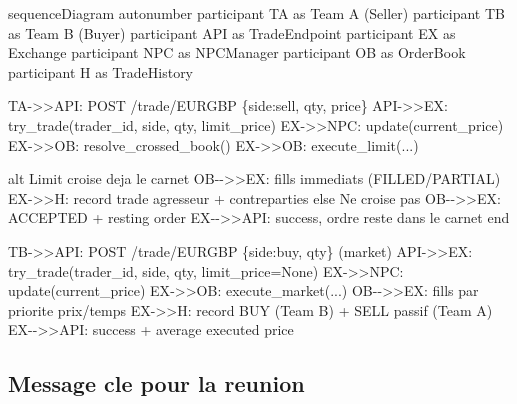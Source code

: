 \documentclass[
]{article}
\newenvironment{Shaded}{\begin{snugshade}}{\end{snugshade}}
\newcommand{\NormalTok}[1]{#1}
\begin{document}
\begin{Shaded}
\begin{Highlighting}[]
\NormalTok{sequenceDiagram}
\NormalTok{    autonumber}
\NormalTok{    participant TA as Team A (Seller)}
\NormalTok{    participant TB as Team B (Buyer)}
\NormalTok{    participant API as TradeEndpoint}
\NormalTok{    participant EX as Exchange}
\NormalTok{    participant NPC as NPCManager}
\NormalTok{    participant OB as OrderBook}
\NormalTok{    participant H as TradeHistory}

\NormalTok{    TA{-}\textgreater{}\textgreater{}API: POST /trade/EURGBP \{side:sell, qty, price\}}
\NormalTok{    API{-}\textgreater{}\textgreater{}EX: try\_trade(trader\_id, side, qty, limit\_price)}
\NormalTok{    EX{-}\textgreater{}\textgreater{}NPC: update(current\_price)}
\NormalTok{    EX{-}\textgreater{}\textgreater{}OB: resolve\_crossed\_book()}
\NormalTok{    EX{-}\textgreater{}\textgreater{}OB: execute\_limit(...)}

\NormalTok{    alt Limit croise deja le carnet}
\NormalTok{        OB{-}{-}\textgreater{}\textgreater{}EX: fills immediats (FILLED/PARTIAL)}
\NormalTok{        EX{-}\textgreater{}\textgreater{}H: record trade agresseur + contreparties}
\NormalTok{    else Ne croise pas}
\NormalTok{        OB{-}{-}\textgreater{}\textgreater{}EX: ACCEPTED + resting order}
\NormalTok{        EX{-}{-}\textgreater{}\textgreater{}API: success, ordre reste dans le carnet}
\NormalTok{    end}

\NormalTok{    TB{-}\textgreater{}\textgreater{}API: POST /trade/EURGBP \{side:buy, qty\} (market)}
\NormalTok{    API{-}\textgreater{}\textgreater{}EX: try\_trade(trader\_id, side, qty, limit\_price=None)}
\NormalTok{    EX{-}\textgreater{}\textgreater{}NPC: update(current\_price)}
\NormalTok{    EX{-}\textgreater{}\textgreater{}OB: execute\_market(...)}
\NormalTok{    OB{-}{-}\textgreater{}\textgreater{}EX: fills par priorite prix/temps}
\NormalTok{    EX{-}\textgreater{}\textgreater{}H: record BUY (Team B) + SELL passif (Team A)}
\NormalTok{    EX{-}{-}\textgreater{}\textgreater{}API: success + average executed price}
\end{Highlighting}
\end{Shaded}

\subsection{Message cle pour la
reunion}\label{message-cle-pour-la-reunion}
\end{document}
